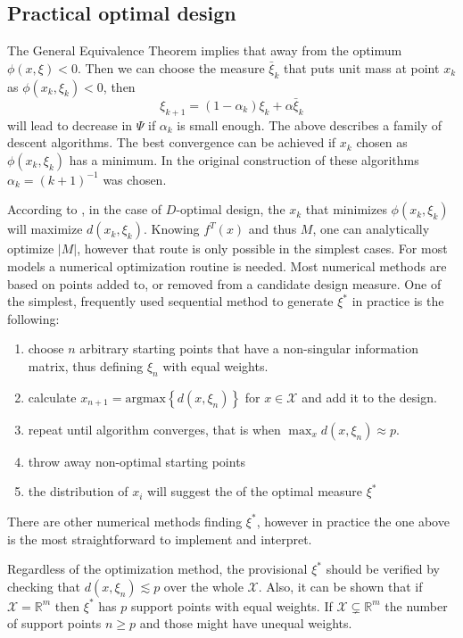 \documentclass[12pt]{iopart}
\begin{document}
\subsection{Practical optimal design}
\label{sec:findoptimal}
The General Equivalence Theorem implies that away from the optimum $\phi(x, \xi) < 0$. Then we can choose the measure $\bar \xi_k$ that puts unit mass at point $x_k$ as $\phi(x_k, \xi_k) < 0$, then
\begin{equation}
\xi_{k+1} = (1-\alpha_k) \xi_k + \alpha \bar \xi_k
\end{equation}
will lead to decrease in $\Psi$ if $\alpha_k$ is small enough. The above describes a family of descent algorithms. The best convergence can be achieved if $x_k$ chosen as $\phi(x_k, \xi_k)$ has a minimum. In the original construction of these algorithms $\alpha_k = (k+1)^{-1}$ was chosen.

According to , in the case of $D$-optimal design, the $x_k$ that minimizes $\phi(x_k, \xi_k)$ will maximize $d(x_k, \xi_k)$. Knowing $f^T(x)$ and thus $M$, one can analytically optimize $|M|$, however that route is only possible in the simplest cases. For most models a numerical optimization routine is needed. Most numerical methods are based on points added to, or removed from a candidate design measure. One of the simplest, frequently used sequential method to generate $\xi^*$ in practice is the following:
\begin{enumerate}
\item choose $n$ arbitrary starting points that have a non-singular information matrix, thus defining $\xi_n$ with equal weights.
\item calculate $x_{n+1} = \mathrm{argmax}\left\{d(x, \xi_n)\right\}$ for $x \in \mathcal{X}$ and add it to the design.
\item repeat until algorithm converges, that is when $\max_{x} d(x, \xi_{n}) \approx p$.
\item throw away non-optimal starting points
\item the distribution of $x_i$ will suggest the of the optimal measure $\xi^*$
\end{enumerate}
There are other numerical methods finding $\xi^*$, however in practice the one above is the most straightforward to implement and interpret.

Regardless of the optimization method, the provisional $\xi^*$ should be verified by checking that $d(x, \xi_{n}) \lesssim p$ over the whole $\mathcal{X}$. Also, it can be shown that if $\mathcal{X} = \mathbb{R}^m$ then $\xi^*$ has $p$ support points with equal weights. If $\mathcal{X} \subsetneq \mathbb{R}^m$ the number of support points $n \geq p$ and those might have unequal weights.
\end{document}
